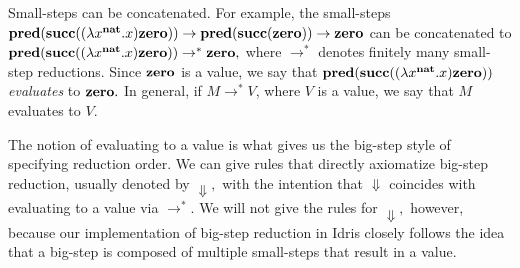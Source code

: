 Small-steps can be concatenated. For example, the small-steps $\textbf{pred}(\textbf{succ}((\lambda x^{\textbf{nat}}.x)\textbf{zero})) \to \textbf{pred}(\textbf{succ}(\textbf{zero})) \to \textbf{zero}$ can be concatenated to $\textbf{pred}(\textbf{succ}((\lambda x^{\textbf{nat}}.x)\textbf{zero})) \to^* \textbf{zero},$ where $\to^*$ denotes finitely many small-step reductions. Since $\textbf{zero}$ is a value, we say that $\textbf{pred}(\textbf{succ}((\lambda x^{\textbf{nat}}.x)\textbf{zero}))$ \textit{evaluates} to $\textbf{zero}.$ In general, if $M \to^* V$, where $V$ is a value, we say that $M$ evaluates to $V.$

The notion of evaluating to a value is what gives us the big-step style of specifying reduction order. We can give rules that directly axiomatize big-step reduction, usually denoted by $\Downarrow,$ with the intention that $\Downarrow$ coincides with evaluating to a value via $\to^*.$ We will not give the rules for $\Downarrow,$ however, because our implementation of big-step reduction in Idris closely follows the idea that a big-step is composed of multiple small-steps that result in a value.


